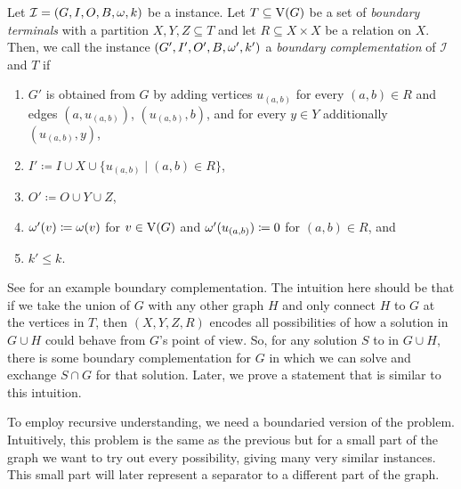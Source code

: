 \begin{theorem}
\begin{definition}\label{def:scc_border_complementation}
  Let $\mathcal{I} = (G,I,O,B,\operatorname{\omega},k)$ be a \scsrec{} instance. Let $T \subseteq \operatorname{V}({G})$ be a set of \emph{boundary terminals} with a partition $X,Y,Z \subseteq T$ and let $R \subseteq X \times X$ be a relation on $X$. Then, we call the instance $(G',I',O',B,\operatorname{\omega}',k')$ a \emph{boundary complementation} of $\mathcal{I}$ and $T$ if
   \begin{enumerate}%
    \item $G'$ is obtained from $G$ by adding vertices $u_{(a,b)}$ for every $(a,b) \in R$ and edges $(a, u_{(a,b)})$, $(u_{(a,b)}, b)$, and for every $y \in Y$ additionally $(u_{(a,b)}, y)$,
    \item $I' \coloneqq I \cup X \cup \{u_{(a,b)} \mid (a,b) \in R\}$,
    \item $O' \coloneqq O \cup Y \cup Z$,
    \item $\operatorname{\omega}'(v) \coloneqq \operatorname{\omega}({v})$ for $v \in \operatorname{V}({G})$ and $\operatorname{\omega}'(u_{(a,b)}) \coloneqq 0$ for $(a,b) \in R$, and
    \item $k' \le k$.\qedhere
  \end{enumerate}
\end{definition}

See  for an example boundary complementation.
The intuition here should be that if we take the union of $G$ with any other graph $H$ and only connect $H$ to $G$ at the vertices in $T$, then $(X,Y,Z,R)$ encodes all possibilities of how a solution in $G \cup H$ could behave from $G$'s point of view. So, for any solution $S$ to \scsrec{} in $G \cup H$, there is some boundary complementation for $G$ in which we can solve and exchange $S \cap G$ for that solution. Later, we prove a statement that is similar to this intuition.

To employ recursive understanding, we need a boundaried version of the problem. Intuitively, this problem is the same as the previous \scsrec{} but for a small part of the graph we want to try out every possibility, giving many very similar instances. This small part will later represent a separator to a different part of the graph. 

\begin{tcolorbox}[enhanced,title={\color{black} {\scsborder{}}}, colback=white, boxrule=0.4pt,
	attach boxed title to top left={xshift=.3cm, yshift*=-2.5mm},
	boxed title style={size=small,frame hidden,colback=white}]
	

\end{tcolorbox}
\end{theorem}
